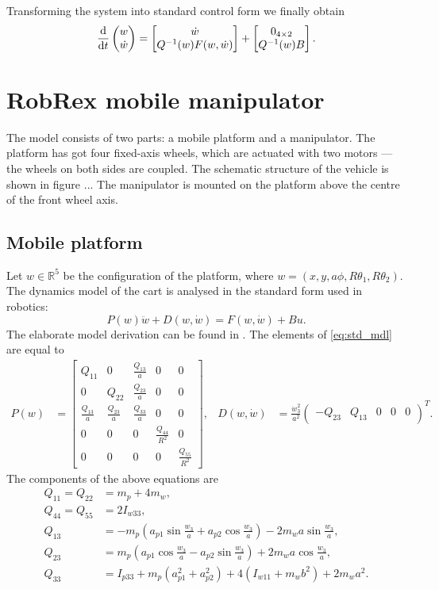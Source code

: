 Transforming the system into standard control form we finally obtain
\begin{equation}
\frac{\mathrm{d}}{\mathrm{d} t}\begin{pmatrix}
w \\ \dot w
\end{pmatrix}
 = 
 \begin{bmatrix}
 \dot w \\ Q^{-1}(w)F(w, \dot w)
 \end{bmatrix}+\begin{bmatrix}
 0_{4\times 2} \\ Q^{-1}(w)B
 \end{bmatrix}.
\end{equation}
\section{RobRex mobile manipulator}
The model consists of two parts: a mobile platform and a manipulator. The platform has got four fixed-axis wheels, which are actuated with two motors --- the wheels on both sides are coupled. The schematic structure of the vehicle is shown in figure ... %
The manipulator is mounted on the platform above the centre of the front wheel axis.
\subsection{Mobile platform}
Let $w\in \mathbb{R}^5$ be the configuration of the platform, where
$w=(x, y, a\phi, R\theta_1, R\theta_2)$.  
The dynamics model of the cart is analysed in the standard form used in robotics:
\begin{equation}
\label{eq:std_mdl}
P(w)\ddot w + D(w, \dot w) = F(w, \dot w) + Bu.
\end{equation}
The elaborate model derivation can be found in \cite{coupled}. 
The elements of \eqref{eq:std_mdl} are equal to
\begin{align}
P(w) &= \begin{bmatrix}
Q_{11} & 0 & \frac{Q_{13}}{a} & 0 & 0\\
0 & Q_{22} & \frac{Q_{23}}{a} & 0 & 0\\
\frac{Q_{13}}{a} & \frac{Q_{23}}{a} & \frac{Q_{33}}{a} & 0 & 0\\
0 & 0 & 0 & \frac{Q_{44}}{R^2} & 0 \\
0 & 0 & 0 & 0 & \frac{Q_{55}}{R^2}
\end{bmatrix}, & 
D(w, \dot w) &= \frac{\dot w_3^2}{a^2}\begin{pmatrix}
-Q_{23} & Q_{13} & 0 & 0 & 0
\end{pmatrix}^T.
\end{align}
The components of the above equations are
\begin{align}
Q_{11} = Q_{22} &= m_p+4m_w,\\
Q_{44} = Q_{55} &= 2I_{w33},\\
Q_{13} &= -m_p(a_{p1}\sin\frac{w_3}{a}+a_{p2}\cos\frac{w_3}{a})- 2m_wa\sin\frac{w_3}{a},\\
Q_{23} &=  m_p(a_{p1}\cos\frac{w_3}{a}-a_{p2}\sin\frac{w_3}{a})+ 2m_wa\cos\frac{w_3}{a},\\
Q_{33} &= I_{p33}+m_p(a_{p1}^2+a_{p2}^2)+4(I_{w11}+m_wb^2)+2m_wa^2.
\end{align}

